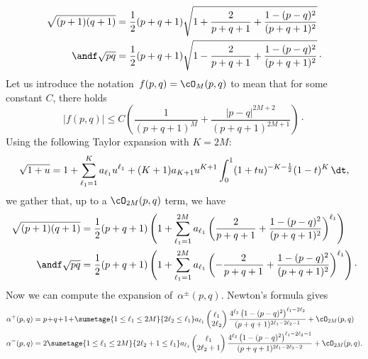 \begin{align*}
\sqrt {(p+1)(q+1)} &= \frac 12 (p+q+1) \sqrt {1+\frac 2 {p+q+1} +\frac {1-(p-q)^2} {(p+q+1)^2}}\\
\andf\sqrt {pq} &= \frac 12 (p+q+1) \sqrt {1-\frac 2 {p+q+1} +\frac {1-(p-q)^2} {(p+q+1)^2}}\,\cdotp
\end{align*}
Let us introduce the notation~$f(p,q)=\cO_M(p,q)$ to mean that for some constant $C$, there holds
\[
|f(p,q)|\leq C\left(\frac{1}{(p+q+1)^M}+\frac{|p-q|^{2M+2}}{(p+q+1)^{2M+1}}\right) \cdotp
\]
Using the following Taylor expansion with $K=2M$:
\[
\sqrt{1+u}=1+\sum_{\ell_1=1}^{K} a_{\ell_1} u^{\ell_1} + (K+1)a_{K+1}u^{K+1}\int_0^1(1+tu)^{-K-\frac12}(1-t)^{K}\,\dt,
\]
we gather that, up to a $\cO_{2M}(p,q)$ term, we have
\[
\begin{aligned}
\sqrt {(p+1)(q+1)} &=
\frac 12 (p+q+1) \left(1+\sum_{\ell_1=1} ^{2M} a_{\ell_1}\left(\frac 2 {p+q+1} +\frac {1-(p-q)^2} {(p+q+1)^2}\right) ^{\ell_1}\right)\\ \andf
\sqrt {pq} &=
\frac 12 (p+q+1) \left(1+\sum_{\ell_1=1} ^{2M} a_{\ell_1}\left(- \frac 2 {p+q+1} +\frac {1-(p-q)^2} {(p+q+1)^2}\right) ^{\ell_1}\right)\cdotp
\end{aligned}
\]
Now we can compute the expansion of~$\alpha^\pm(p,q)$. Newton's formula gives
\begin{equation}\label{typeSgenedemoeq12}
\begin{aligned}
\alpha^+(p,q) &= p\!+\!q\!+\!1 \!+\!\sumetage {1\leq \ell_1\leq 2M} {2\ell_2\leq \ell_1} a_{\ell_1}
\begin{pmatrix} \ell_1 \\ 2\ell_2
\end{pmatrix} \frac {4^{\ell_2} \left(1-(p-q)^2\right)^{\ell_1-2\ell_2} } {(p+q+1)^{2\ell_1-2\ell_2-1}}+\cO_{2M}(p,q) \\
\alpha^-(p,q) &= 2\sumetage {1\leq \ell_1\leq 2M} {2\ell_2+1\leq \ell_1} a_{\ell_1}
\begin{pmatrix} \ell_1 \\ 2\ell_2+1
\end{pmatrix} \frac {4^{\ell_2} \left(1-(p-q)^2\right)^{\ell_1-2\ell_2-1} } {(p+q+1)^{2\ell_1-2\ell_2-2}}+\cO_{2M}(p,q).
\end{aligned}
\end{equation}

